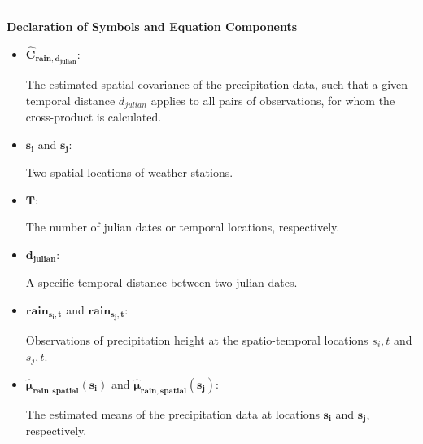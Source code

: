 \documentclass[
  12pt,
]{article}
\begin{document}
\citet{Cressie.2011} \textbar{} \citet{Wikle.2019} \textbar{}
\citet{Auer.2020}

\rule{1\linewidth}{0.5pt}

\textbf{Declaration of Symbols and Equation Components}

\begin{itemize}[label={}]
            \item$\mathbf{\widehat{C}_{rain,d_{julian}}}$:
            \begin{adjustwidth}{1cm}{0cm} The estimated spatial covariance of the precipitation data, such that a given temporal distance $d_{julian}$ applies to all pairs of observations, for whom the cross-product is calculated.
            \end{adjustwidth}
            \item $\mathbf{s_{i}}$ and $\mathbf{s_{j}}$:\\ 
              \begin{adjustwidth}{1cm}{0cm} Two spatial locations of weather stations. \end{adjustwidth}
            \item $\mathbf{T}$:\\ 
              \begin{adjustwidth}{1cm}{0cm} The number of julian dates or temporal locations, respectively. \end{adjustwidth}
            \item $\mathbf{d_{julian}}$:\\ 
              \begin{adjustwidth}{1cm}{0cm} A specific temporal distance between two julian dates. \end{adjustwidth}
            \item $\mathbf{rain_{s_i,t}}$ and $\mathbf{rain_{s_j,t}}$:\\ 
              \begin{adjustwidth}{1cm}{0cm} Observations of precipitation height at the spatio-temporal locations $s_i,t$ and $s_j,t$. \end{adjustwidth}
            \item $\mathbf{\widehat{\mu}_{rain,spatial}(s_i)}$ and $\mathbf{\widehat{\mu}_{rain,spatial}(s_j)}$:\\ 
              \begin{adjustwidth}{1cm}{0cm} The estimated means of the precipitation data at locations $\mathbf{s_i}$ and $\mathbf{s_j}$,  respectively. \end{adjustwidth}
\end{itemize}
\end{document}
